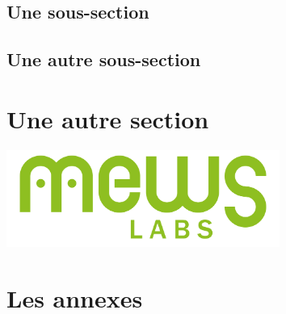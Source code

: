 \documentclass[a4paper, french, 10pt]{article}
\begin{document}
\subsection{Une sous-section}

\lipsum[1]

\subsection{Une autre sous-section}

\lipsum[3]




\section{Une autre section}

\lipsum[4-6]

\begin{mfig}
  \includegraphics[width=0.67\textwidth]{mewslabs.png}
\end{mfig}




\clearpage
\appendix
\section{Les annexes}

\lipsum[5]


\end{document}
